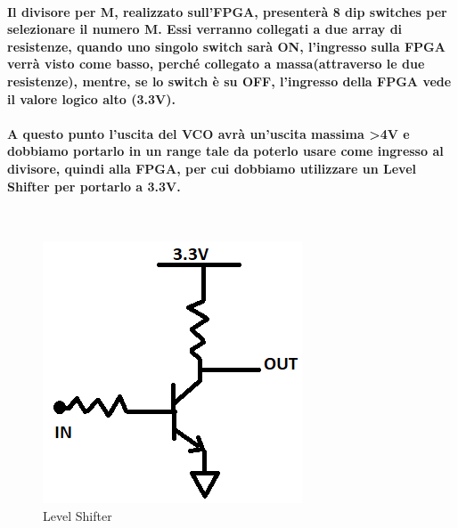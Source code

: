 \documentclass[a4paper]{article}
\begin{document}
\paragraph{Il divisore per M, realizzato sull'FPGA, presenterà 8 dip switches per selezionare il numero M. Essi verranno collegati a due array di resistenze, quando uno singolo switch sarà ON, l'ingresso sulla FPGA verrà visto come basso, perché collegato a massa(attraverso le due resistenze), mentre, se lo switch è su OFF, l'ingresso della FPGA vede il valore logico alto (3.3V).}
\paragraph{A questo punto l'uscita del VCO avrà un'uscita massima \textgreater 4V e dobbiamo portarlo in un range tale da poterlo usare come ingresso al divisore, quindi alla FPGA, per cui dobbiamo utilizzare un Level Shifter per portarlo a 3.3V.}
~\begin{figure}[H]%
\includegraphics[scale=0.7]{Level.png} 
\centering
\caption{Level Shifter}
\label{fig:foo}
\end{figure}
\end{document}

